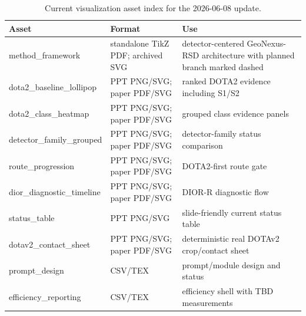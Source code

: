 \begin{table}[t]
\centering
\small
\caption{Current visualization asset index for the 2026-06-08 update.}
\label{tab:visual_asset_index}
\begin{tabular}{lll}
\toprule
Asset & Format & Use \\
\midrule
method\_framework & standalone TikZ PDF; archived SVG & detector-centered GeoNexus-RSD architecture with planned branch marked dashed \\
dota2\_baseline\_lollipop & PPT PNG/SVG; paper PDF/SVG & ranked DOTA2 evidence including S1/S2 \\
dota2\_class\_heatmap & PPT PNG/SVG; paper PDF/SVG & grouped class evidence panels \\
detector\_family\_grouped & PPT PNG/SVG; paper PDF/SVG & detector-family status comparison \\
route\_progression & PPT PNG/SVG; paper PDF/SVG & DOTA2-first route gate \\
dior\_diagnostic\_timeline & PPT PNG/SVG; paper PDF/SVG & DIOR-R diagnostic flow \\
status\_table & PPT PNG/SVG & slide-friendly current status table \\
dotav2\_contact\_sheet & PPT PNG/SVG; paper PDF/SVG & deterministic real DOTAv2 crop/contact sheet \\
prompt\_design & CSV/TEX & prompt/module design and status \\
efficiency\_reporting & CSV/TEX & efficiency shell with TBD measurements \\
\bottomrule
\end{tabular}
\end{table}
